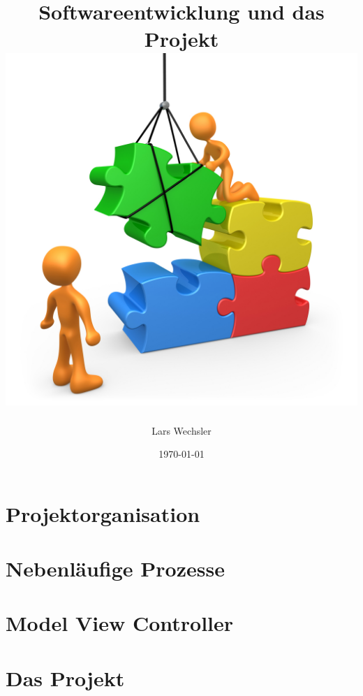 \documentclass{article}
\author{Lars Wechsler}
\title{Softwareentwicklung und \textbf{das Projekt} \\ \includegraphics[scale=0.7]{media/puzzle_cartoon.jpg}}
\date{\today}
\begin{document}
\maketitle
\newpage
\tableofcontents
\newpage 

\section{Projektorganisation}


\newpage

\section{Nebenläufige Prozesse}


\newpage

\section{Model View Controller}


\newpage 


\section{Das Projekt}

\end{document}
